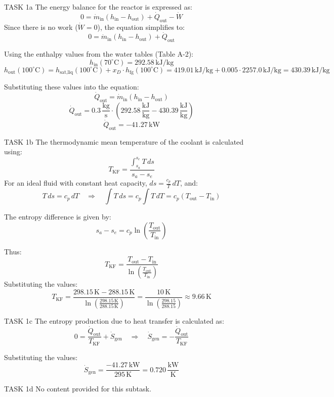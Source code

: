 TASK 1a  
The energy balance for the reactor is expressed as:  
\[
0 = \dot{m}_{\text{in}} \left( h_{\text{in}} - h_{\text{out}} \right) + \dot{Q}_{\text{out}} - \dot{W}
\]  
Since there is no work (\( \dot{W} = 0 \)), the equation simplifies to:  
\[
0 = \dot{m}_{\text{in}} \left( h_{\text{in}} - h_{\text{out}} \right) + \dot{Q}_{\text{out}}
\]  

Using the enthalpy values from the water tables (Table A-2):  
\[
h_{\text{in}}(70^\circ\text{C}) = 292.58 \, \text{kJ/kg}
\]  
\[
h_{\text{out}}(100^\circ\text{C}) = h_{\text{sat,liq}}(100^\circ\text{C}) + x_D \cdot h_{\text{fg}}(100^\circ\text{C}) = 419.01 \, \text{kJ/kg} + 0.005 \cdot 2257.0 \, \text{kJ/kg} = 430.39 \, \text{kJ/kg}
\]  

Substituting these values into the equation:  
\[
\dot{Q}_{\text{out}} = \dot{m}_{\text{in}} \left( h_{\text{in}} - h_{\text{out}} \right)
\]  
\[
\dot{Q}_{\text{out}} = 0.3 \, \frac{\text{kg}}{\text{s}} \cdot \left( 292.58 \, \frac{\text{kJ}}{\text{kg}} - 430.39 \, \frac{\text{kJ}}{\text{kg}} \right)
\]  
\[
\dot{Q}_{\text{out}} = -41.27 \, \text{kW}
\]  

TASK 1b  
The thermodynamic mean temperature of the coolant is calculated using:  
\[
T_{\text{KF}} = \frac{\int_{s_a}^{s_e} T \, ds}{s_a - s_e}
\]  
For an ideal fluid with constant heat capacity, \( ds = \frac{c_p}{T} \, dT \), and:  
\[
T \, ds = c_p \, dT \quad \Rightarrow \quad \int T \, ds = c_p \int T \, dT = c_p \left( T_{\text{out}} - T_{\text{in}} \right)
\]  

The entropy difference is given by:  
\[
s_a - s_e = c_p \ln \left( \frac{T_{\text{out}}}{T_{\text{in}}} \right)
\]  

Thus:  
\[
T_{\text{KF}} = \frac{T_{\text{out}} - T_{\text{in}}}{\ln \left( \frac{T_{\text{out}}}{T_{\text{in}}} \right)}
\]  
Substituting the values:  
\[
T_{\text{KF}} = \frac{298.15 \, \text{K} - 288.15 \, \text{K}}{\ln \left( \frac{298.15 \, \text{K}}{288.15 \, \text{K}} \right)} = \frac{10 \, \text{K}}{\ln \left( \frac{298.15}{288.15} \right)} \approx 9.66 \, \text{K}
\]  

TASK 1c  
The entropy production due to heat transfer is calculated as:  
\[
0 = \frac{\dot{Q}_{\text{out}}}{T_{\text{KF}}} + \dot{S}_{\text{gen}} \quad \Rightarrow \quad \dot{S}_{\text{gen}} = -\frac{\dot{Q}_{\text{out}}}{T_{\text{KF}}}
\]  

Substituting the values:  
\[
\dot{S}_{\text{gen}} = \frac{-41.27 \, \text{kW}}{295 \, \text{K}} = 0.720 \, \frac{\text{kW}}{\text{K}}
\]  

TASK 1d  
No content provided for this subtask.